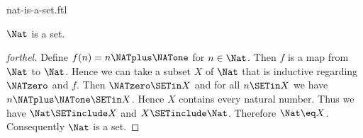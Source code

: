 \documentclass{stex}
\begin{document}
\begin{smodule}{nat-is-a-set.ftl}

\begin{proposition}[forthel,id=ARITHMETIC_07_4685510236547454]
  $\Nat$ is a set.
\end{proposition}
\begin{proof}[forthel]
  Define $f(n) = n \NATplus \NATone$ for $n \in \Nat$.
  Then $f$ is a map from $\Nat$ to $\Nat$.
  Hence we can take a subset $X$ of $\Nat$ that is inductive regarding
  $\NATzero$ and $f$.
  Then $\NATzero \SETin X$ and for all $n \SETin X$ we have $n \NATplus \NATone \SETin X$.
  Hence $X$ contains every natural number.
  Thus we have $\Nat \SETinclude X$ and $X \SETinclude \Nat$.
  Therefore $\Nat \eq X$.
  Consequently $\Nat$ is a set.
\end{proof}
\end{smodule}
\end{document}
